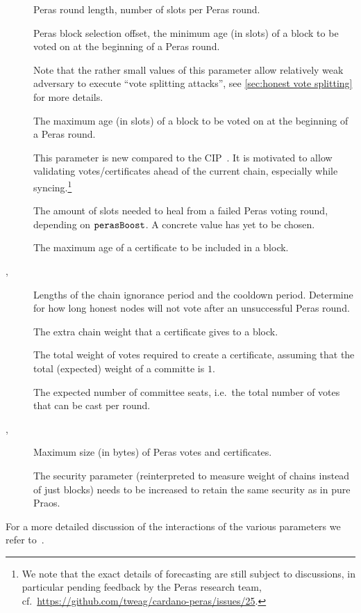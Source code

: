 \begin{description}
\item[\perasRoundSlots]
  Peras round length, number of slots per Peras round.
\item[\perasBlockMinSlots]
  Peras block selection offset, the minimum age (in slots) of a block to be voted on at the beginning of a Peras round.

  Note that the rather small values of this parameter allow relatively weak adversary to execute \enquote{vote splitting attacks}, see \cref{sec:honest vote splitting} for more details.
\item[\perasBlockMaxSlots]
  The maximum age (in slots) of a block to be voted on at the beginning of a Peras round.

  This parameter is new compared to the CIP~\cite{peras-cip}.
  It is motivated to allow validating votes/certificates ahead of the current chain, especially while syncing.\footnote{
  We note that the exact details of forecasting are still subject to discussions, in particular pending feedback by the Peras research team, cf.~\url{https://github.com/tweag/cardano-peras/issues/25}.}
\item[\perasHealingSlots]
  The amount of slots needed to heal from a failed Peras voting round, depending on $\mathtt{perasBoost}$.
  A concrete value has yet to be chosen.
\item[\perasCertMaxSlots]
  The maximum age of a certificate to be included in a block.
\item[\perasIgnoranceRounds, \perasCooldownRounds]
  Lengths of the chain ignorance period and the cooldown period.
  Determine for how long honest nodes will not vote after an unsuccessful Peras round.
\item[\perasBoost]
  The extra chain weight that a certificate gives to a block.
\item[\perasQuorum]
  The total weight of votes required to create a certificate, assuming that the total (expected) weight of a committe is $1$.
\item[\perasN]
  The expected number of committee seats, i.e.\ the total number of votes that can be cast per round.
\item[\perasVoteSizeLimit, \perasCertSizeLimit]
  Maximum size (in bytes) of Peras votes and certificates.
\item[\kcp]
  The security parameter (reinterpreted to measure weight of chains instead of just blocks) needs to be increased to retain the same security as in pure Praos.
\end{description}

For a more detailed discussion of the interactions of the various parameters we refer to~\cite{peras-cip}.

